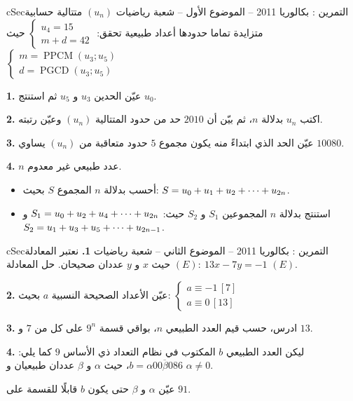 \documentclass[12pt,a4paper]{article}
\newenvironment{BOX}[2]{\begin{otherlanguage}{english}\begin{arbox}{#1}{#2}}{\end{arbox}\end{otherlanguage}}
\newcounter{exo}
\newenvironment{tamrin}[1]{\stepcounter{exo}\begin{BOX}{cSec}{التمرين \theexo: #1}}{\end{BOX}}
\renewcommand{\cdots}{\mathinner{\cdotp\cdotp\cdotp}}
\newcommand{\pgcd}{\operatorname{PGCD}}
\newcommand{\ppcm}{\operatorname{PPCM}}
\newenvironment{sq}{\begin{itemize}[leftmargin=2.4em,itemsep=3pt]}{\end{itemize}}
\newcommand{\qa}{\item[(أ)]}\newcommand{\qb}{\item[(ب)]}\newcommand{\qc}{\item[(جـ)]}\newcommand{\qd}{\item[(د)]}\newcommand{\qe}{\item[(هـ)]}
\begin{document}
\begin{tamrin}{بكالوريا 2011 -- الموضوع الأول -- شعبة رياضيات}
$(u_n)$ متتالية حسابية متزايدة تماما حدودها أعداد طبيعية تحقق: $\begin{cases}u_4=15\\ m+d=42\end{cases}$ حيث $\begin{cases}m=\ppcm(u_3;u_5)\\ d=\pgcd(u_3;u_5)\end{cases}$

\textbf{1.} عيّن الحدين $u_3$ و $u_5$ ثم استنتج $u_0$.

\textbf{2.} اكتب $u_n$ بدلالة $n$، ثم بيّن أن $2010$ حد من حدود المتتالية $(u_n)$ وعيّن رتبته.

\textbf{3.} عيّن الحد الذي ابتداءً منه يكون مجموع $5$ حدود متعاقبة من $(u_n)$ يساوي $10080$.

\textbf{4.} $n$ عدد طبيعي غير معدوم.
\begin{sq}
\qa أحسب بدلالة $n$ المجموع $S$ بحيث: $S=u_0+u_1+u_2+\cdots+u_{2n}$.
\qb استنتج بدلالة $n$ المجموعين $S_1$ و $S_2$ حيث: $S_1=u_0+u_2+u_4+\cdots+u_{2n}$ و $S_2=u_1+u_3+u_5+\cdots+u_{2n-1}$.
\end{sq}
\end{tamrin}

\begin{tamrin}{بكالوريا 2011 -- الموضوع الثاني -- شعبة رياضيات}
\textbf{1.} نعتبر المعادلة $(E):\ 13x-7y=-1$ حيث $x$ و $y$ عددان صحيحان. حل المعادلة $(E)$.

\textbf{2.} عيّن الأعداد الصحيحة النسبية $a$ بحيث: $\begin{cases}a\equiv-1\,[7]\\ a\equiv0\,[13]\end{cases}$

\textbf{3.} ادرس، حسب قيم العدد الطبيعي $n$، بواقي قسمة $9^n$ على كل من $7$ و $13$.

\textbf{4.} ليكن العدد الطبيعي $b$ المكتوب في نظام التعداد ذي الأساس $9$ كما يلي: $b=\overline{\alpha00\beta086}$، حيث $\alpha$ و $\beta$ عددان طبيعيان و $\alpha\neq0$.

عيّن $\alpha$ و $\beta$ حتى يكون $b$ قابلًا للقسمة على $91$.
\end{tamrin}
\end{document}
